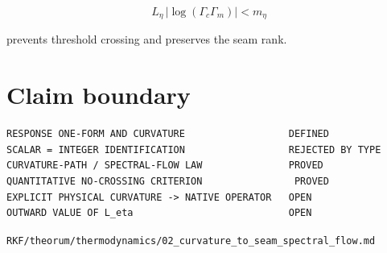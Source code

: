 \[
\boxed{
L_\eta\,|\log(\Gamma_c\Gamma_m)|<m_\eta
}
\]

prevents threshold crossing and preserves the seam rank.

\hypertarget{claim-boundary}{%
\section{Claim boundary}\label{claim-boundary}}

\begin{verbatim}
RESPONSE ONE-FORM AND CURVATURE                  DEFINED
SCALAR = INTEGER IDENTIFICATION                  REJECTED BY TYPE
CURVATURE-PATH / SPECTRAL-FLOW LAW               PROVED
QUANTITATIVE NO-CROSSING CRITERION                PROVED
EXPLICIT PHYSICAL CURVATURE -> NATIVE OPERATOR   OPEN
OUTWARD VALUE OF L_eta                           OPEN
\end{verbatim}

\begin{flushright}\small\texttt{RKF/theorum/thermodynamics/02\_curvature\_to\_seam\_spectral\_flow.md}\end{flushright}
